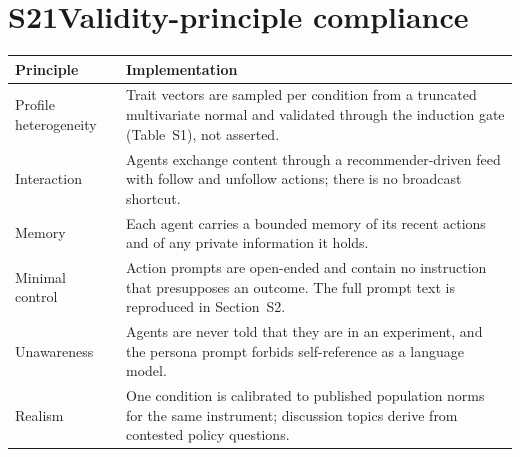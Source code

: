 \documentclass[11pt]{article}
\begin{document}
\section*{S21\quad Validity-principle compliance}
\begin{longtable}{@{}p{3.2cm}p{10.5cm}@{}}
\toprule
Principle & Implementation \\
\midrule
\endhead
Profile heterogeneity & Trait vectors are sampled per condition from a truncated multivariate normal and validated through the induction gate (Table~S1), not asserted. \\[2pt]
Interaction & Agents exchange content through a recommender-driven feed with follow and unfollow actions; there is no broadcast shortcut. \\[2pt]
Memory & Each agent carries a bounded memory of its recent actions and of any private information it holds. \\[2pt]
Minimal control & Action prompts are open-ended and contain no instruction that presupposes an outcome. The full prompt text is reproduced in Section~S2. \\[2pt]
Unawareness & Agents are never told that they are in an experiment, and the persona prompt forbids self-reference as a language model. \\[2pt]
Realism & One condition is calibrated to published population norms for the same instrument; discussion topics derive from contested policy questions. \\[2pt]
\bottomrule
\end{longtable}
\end{document}

